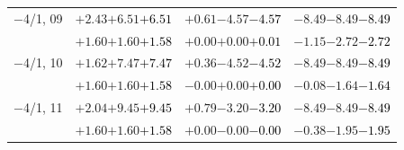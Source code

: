 \documentclass[compress]{beamer}
\begin{document}
\begin{frame}
\begin{tabular}{r | c | c | c}
$-$4/1, 09 & $+2.43$\hspace{0.1 cm}$+6.51$\hspace{0.1 cm}\textcolor{black}{$+6.51$} & $+0.61$\hspace{0.1 cm}$-4.57$\hspace{0.1 cm}\textcolor{black}{$-4.57$} & $-8.49$\hspace{0.1 cm}$-8.49$\hspace{0.1 cm}\textcolor{black}{$-8.49$} \\
           & $+1.60$\hspace{0.1 cm}$+1.60$\hspace{0.1 cm}\textcolor{black}{$+1.58$} & $+0.00$\hspace{0.1 cm}$+0.00$\hspace{0.1 cm}\textcolor{black}{$+0.01$} & $-1.15$\hspace{0.1 cm}$-2.72$\hspace{0.1 cm}\textcolor{black}{$-2.72$} \\
$-$4/1, 10 & $+1.62$\hspace{0.1 cm}$+7.47$\hspace{0.1 cm}\textcolor{black}{$+7.47$} & $+0.36$\hspace{0.1 cm}$-4.52$\hspace{0.1 cm}\textcolor{black}{$-4.52$} & $-8.49$\hspace{0.1 cm}$-8.49$\hspace{0.1 cm}\textcolor{black}{$-8.49$} \\
           & $+1.60$\hspace{0.1 cm}$+1.60$\hspace{0.1 cm}\textcolor{black}{$+1.58$} & $-0.00$\hspace{0.1 cm}$+0.00$\hspace{0.1 cm}\textcolor{black}{$+0.00$} & $-0.08$\hspace{0.1 cm}$-1.64$\hspace{0.1 cm}\textcolor{black}{$-1.64$} \\
$-$4/1, 11 & $+2.04$\hspace{0.1 cm}$+9.45$\hspace{0.1 cm}\textcolor{black}{$+9.45$} & $+0.79$\hspace{0.1 cm}$-3.20$\hspace{0.1 cm}\textcolor{black}{$-3.20$} & $-8.49$\hspace{0.1 cm}$-8.49$\hspace{0.1 cm}\textcolor{black}{$-8.49$} \\
           & $+1.60$\hspace{0.1 cm}$+1.60$\hspace{0.1 cm}\textcolor{black}{$+1.58$} & $+0.00$\hspace{0.1 cm}$-0.00$\hspace{0.1 cm}\textcolor{black}{$-0.00$} & $-0.38$\hspace{0.1 cm}$-1.95$\hspace{0.1 cm}\textcolor{black}{$-1.95$} \\

\end{tabular}
\end{frame}
\end{document}
